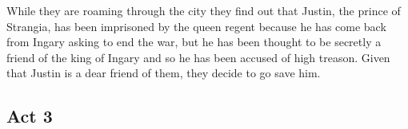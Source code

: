 While they are roaming through the city they find out that Justin, the prince of Strangia, has been imprisoned by the queen regent because he has come back from Ingary asking to end the war, but he has been thought to be secretly a friend of the king of Ingary and so he has been accused of high treason. Given that Justin is a dear friend of them, they decide to go save him.


\subsection*{Act 3}
